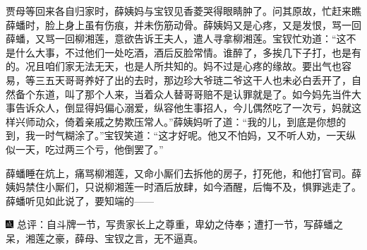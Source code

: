 贾母等回来各自归家时，薛姨妈与宝钗见香菱哭得眼睛肿了。问其原故，忙赶来瞧薛蟠时，脸上身上虽有伤痕，并未伤筋动骨。薛姨妈又是心疼，又是发恨，骂一回薛蟠，又骂一回柳湘莲，意欲告诉王夫人，遣人寻拿柳湘莲。宝钗忙劝道：``这不是什么大事，不过他们一处吃酒，酒后反脸常情。谁醉了，多挨几下子打，也是有的。况且咱们家无法无天，也是人所共知的。妈不过是心疼的缘故。要出气也容易，等三五天哥哥养好了出的去时，那边珍大爷琏二爷这干人也未必白丢开了，自然备个东道，叫了那个人来，当着众人替哥哥赔不是认罪就是了。如今妈先当件大事告诉众人，倒显得妈偏心溺爱，纵容他生事招人，今儿偶然吃了一次亏，妈就这样兴师动众，倚着亲戚之势欺压常人。''薛姨妈听了道：``我的儿，到底是你想的到，我一时气糊涂了。''宝钗笑道：``这才好呢。他又不怕妈，又不听人劝，一天纵似一天，吃过两三个亏，他倒罢了。''

薛蟠睡在炕上，痛骂柳湘莲，又命小厮们去拆他的房子，打死他，和他打官司。薛姨妈禁住小厮们，只说柳湘莲一时酒后放肆，如今酒醒，后悔不及，惧罪逃走了。薛蟠听见如此说了，要知端的------

{\includegraphics[width=3mm]{../Images/00005}  \kaishu 总评：自斗牌一节，写贵家长上之尊重，卑幼之侍奉；遭打一节，写薛蟠之呆，湘莲之豪，薛母、宝钗之言，无不逼真。}
